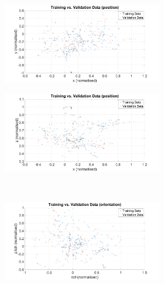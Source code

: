 \begin{figure}
  \centering
  \begin{subfigure}{\textwidth}
    \begin{subfigure}{0.48\textwidth}
      \includegraphics[clip, trim = 80 0 80 0, width=\textwidth]{figures/chapter4/tr_v_v_xy}
    \end{subfigure}
    \begin{subfigure}{0.48\textwidth}
      \includegraphics[clip, trim = 80 0 80 0, width=\textwidth]{figures/chapter4/tr_v_v_xz}
    \end{subfigure}
    \caption{}
  \end{subfigure}
  ~
  \begin{subfigure}{\textwidth}
    \begin{subfigure}{0.48\textwidth}
      \includegraphics[clip, trim = 80 0 80 0, width=\textwidth]{figures/chapter4/tr_v_v_rollpitch}

\end{subfigure}
\end{subfigure}
\end{figure}
